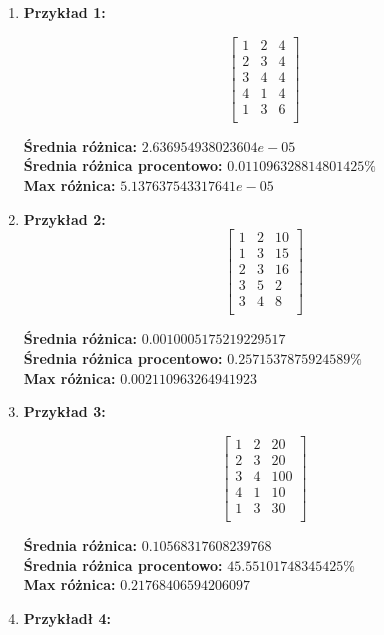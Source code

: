 \documentclass[12pt,a4paper]{article}
\begin{document}
\begin{enumerate}
\item \textbf{Przykład 1:}

\[
\begin{bmatrix}
1 & 2 & 4 \\
2 & 3 & 4 \\
3 & 4 & 4 \\
4 & 1 & 4 \\
1 & 3 & 6 \\
\end{bmatrix}
\]

\textbf{Średnia różnica:} $2.636954938023604e-05$ \\
\textbf{Średnia różnica procentowo:} $0.011096328814801425\%$ \\
\textbf{Max różnica:} $5.137637543317641e-05$

\item \textbf{Przykład 2:}
\[ 
\begin{bmatrix}
1 & 2 & 10 \\
1 & 3 & 15 \\
2 & 3 & 16 \\
3 & 5 & 2 \\
3 & 4 & 8 \\
\end{bmatrix}
\]


\textbf{Średnia różnica:} $0.0010005175219229517$ \\
\textbf{Średnia różnica procentowo:} $0.2571537875924589\%$ \\
\textbf{Max różnica:} $0.002110963264941923$

\newpage

\item \textbf{Przykład 3:}

\[
\begin{bmatrix}
1 & 2 & 20 \\
2 & 3 & 20 \\
3 & 4 & 100 \\
4 & 1 & 10 \\
1 & 3 & 30 \\
\end{bmatrix}
\]

\textbf{Średnia różnica:} $0.10568317608239768$ \\
\textbf{Średnia różnica procentowo:} $45.55101748345425 \%$ \\
\textbf{Max różnica:} $0.21768406594206097$

\item \textbf{Przykładł 4:}


\end{enumerate}
\end{document}
